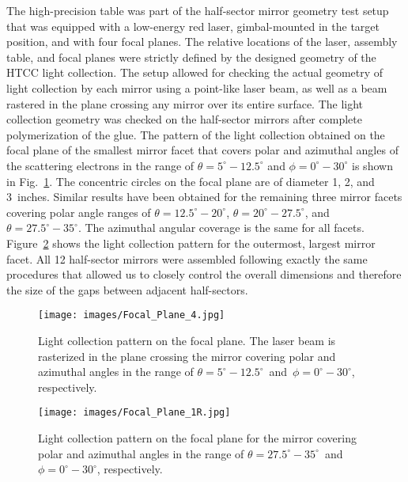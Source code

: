 The high-precision table was part of the half-sector mirror geometry test setup that was equipped with a
low-energy red laser, gimbal-mounted in the target position, and with four focal planes. The relative locations
of the laser, assembly table, and focal planes were strictly defined by the designed geometry of the HTCC
light collection. The setup allowed for checking the actual geometry of light collection by each mirror using a
point-like laser beam, as well as a beam rastered in the plane crossing any mirror over its entire surface. The
light collection geometry was checked on the half-sector mirrors after complete polymerization of the glue.
The pattern of the light collection obtained on the focal plane of the smallest mirror facet that covers polar and
azimuthal angles of the scattering electrons in the range of $\theta = 5^\circ - 12.5^\circ$ and
$\phi = 0^\circ - 30^\circ$ is shown in Fig.~\ref{fig:Focal_Plane_4}. The concentric circles on the focal plane
are of diameter 1, 2, and 3~inches. Similar results have been obtained for the remaining three mirror facets
covering polar angle ranges of $\theta = 12.5^\circ - 20^\circ$, $\theta = 20^\circ - 27.5^\circ$, and
$\theta = 27.5^\circ - 35^\circ$. The azimuthal angular coverage is the same for all facets.
Figure~\ref{fig:Focal_Plane_1R} shows the light collection pattern for the outermost, largest mirror facet.
All 12 half-sector mirrors were assembled following exactly the same procedures that allowed us to closely
control the overall dimensions and therefore the size of the gaps between adjacent half-sectors. 

\begin{figure}[ht]
    \centering
    \texttt{[image: images/Focal\_Plane\_4.jpg]}
    \caption{Light collection pattern on the focal plane. The laser beam is rasterized in the plane crossing the
      mirror covering polar and azimuthal angles in the range of $\theta = 5^\circ - 12.5^\circ$\, and\,
      $\phi = 0^\circ - 30^\circ$, respectively.}
    \label{fig:Focal_Plane_4}
\end{figure}

\begin{figure}[ht]
    \centering
    \texttt{[image: images/Focal\_Plane\_1R.jpg]}
    \caption{Light collection pattern on the focal plane for the mirror covering polar and azimuthal angles in
      the range of $\theta = 27.5^\circ - 35^\circ$\, and\, $\phi = 0^\circ - 30^\circ$, respectively.}
    \label{fig:Focal_Plane_1R}
\end{figure}

